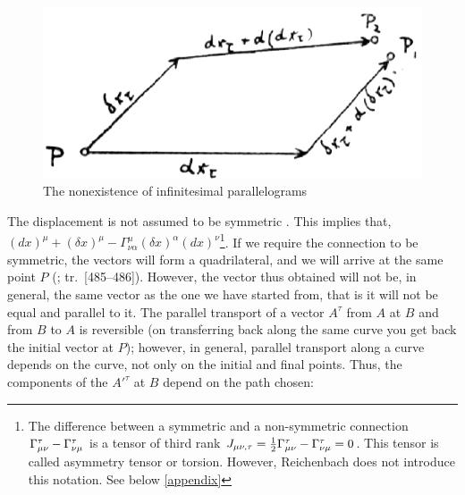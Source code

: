 \documentclass[submitted]{article}
\renewcommand{\rzlap}[2]{(\cite[#1]{Reichenbach1928}; tr.\ [#2])\xspace}
\begin{document}
\begin{figure}
\centering
\includegraphics[scale=0.3]{reichenbachparallelogram.png}
\caption{\label{fig:reichenbachparallelogram} The nonexistence of infinitesimal parallelograms \citep[348]{Reichenbach1928}}
\end{figure}
%
The displacement is not assumed to be symmetric \asym. This implies that,  $(d x)^{\mu}+(\delta x)^{\mu}-\Gamma_{\nu \alpha}^{\mu}(\delta x)^{\alpha}(d x)^{\nu}$\footnote{The difference between a symmetric and a non-symmetric connection $\Gamma^\tau_{\mu\nu}-\Gamma^\tau_{\nu\mu}$ is a tensor of third rank $J_{\mu\nu,\tau}=\frac{1}{2} \Gamma^\tau_{\mu\nu}-\Gamma^\tau_{\nu\mu}=0$. This tensor is called asymmetry tensor or torsion. However, Reichenbach does not introduce this notation. See below \cref{appendix}}. If we require the connection to be symmetric, the vectors will form a quadrilateral, and we will arrive at the same point $P$ \rzlap{348--349}{485--486}. However, the vector thus obtained will not be, in general, the same vector as the one we have started from, that is it will not be equal and parallel to it. The parallel transport of a vector $A^\tau$ from $A$ at $B$ and from $B$ to $A$ is reversible (on transferring back along the same curve you get back the initial vector at $P$); however, in general, parallel transport along a curve depends on the curve, not only on the initial and final points. Thus, the components of the $A'^\tau$ at $B$ depend on the path chosen:
\end{document}

